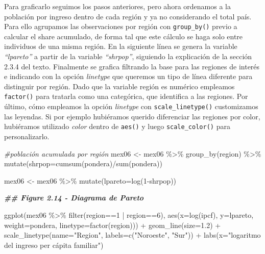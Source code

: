 \documentclass[
]{book}
\newenvironment{Shaded}{\begin{snugshade}}{\end{snugshade}}
\newcommand{\AttributeTok}[1]{\textcolor[rgb]{0.77,0.63,0.00}{#1}}
\newcommand{\CommentTok}[1]{\textcolor[rgb]{0.56,0.35,0.01}{\textit{#1}}}
\newcommand{\DecValTok}[1]{\textcolor[rgb]{0.00,0.00,0.81}{#1}}
\newcommand{\DocumentationTok}[1]{\textcolor[rgb]{0.56,0.35,0.01}{\textbf{\textit{#1}}}}
\newcommand{\FloatTok}[1]{\textcolor[rgb]{0.00,0.00,0.81}{#1}}
\newcommand{\FunctionTok}[1]{\textcolor[rgb]{0.00,0.00,0.00}{#1}}
\newcommand{\NormalTok}[1]{#1}
\newcommand{\OtherTok}[1]{\textcolor[rgb]{0.56,0.35,0.01}{#1}}
\newcommand{\SpecialCharTok}[1]{\textcolor[rgb]{0.00,0.00,0.00}{#1}}
\newcommand{\StringTok}[1]{\textcolor[rgb]{0.31,0.60,0.02}{#1}}
\begin{document}
Para graficarlo seguimos los pasos anteriores, pero ahora ordenamos a la población por ingreso dentro de cada región y ya no considerando el total país. Para ello agrupamos las observaciones por región con \texttt{group\_by()} previo a calcular el share acumulado, de forma tal que este cálculo se haga solo entre individuos de una misma región. En la siguiente línea se genera la variable \emph{``lpareto''} a partir de la variable \emph{``shrpop''}, siguiendo la explicación de la sección 2.3.4 del texto. Finalmente se grafica filtrando la base para las regiones de interés e indicando con la opción \emph{linetype} que queremos un tipo de línea diferente para distinguir por región. Dado que la variable región es numérico empleamos \texttt{factor()} para tratarla como una categórica, que identifica a las regiones. Por último, cómo empleamos la opción \emph{linetype} con \texttt{scale\_linetype()} customizamos las leyendas. Si por ejemplo hubiéramos querido diferenciar las regiones por color, hubiéramos utilizado \emph{color} dentro de \texttt{aes()} y luego \texttt{scale\_color()} para personalizarlo.

\begin{Shaded}
\begin{Highlighting}[]
\CommentTok{\#población acumulada por región}
\NormalTok{mex06 }\OtherTok{\textless{}{-}}\NormalTok{ mex06 }\SpecialCharTok{\%\textgreater{}\%} \FunctionTok{group\_by}\NormalTok{(region) }\SpecialCharTok{\%\textgreater{}\%} \FunctionTok{mutate}\NormalTok{(}\AttributeTok{shrpop=}\FunctionTok{cumsum}\NormalTok{(pondera)}\SpecialCharTok{/}\FunctionTok{sum}\NormalTok{(pondera)) }

\NormalTok{mex06 }\OtherTok{\textless{}{-}}\NormalTok{ mex06 }\SpecialCharTok{\%\textgreater{}\%} \FunctionTok{mutate}\NormalTok{(}\AttributeTok{lpareto=}\FunctionTok{log}\NormalTok{(}\DecValTok{1}\SpecialCharTok{{-}}\NormalTok{shrpop)) }

\DocumentationTok{\#\# Figure 2.14 {-} Diagrama de Pareto}

\FunctionTok{ggplot}\NormalTok{(mex06 }\SpecialCharTok{\%\textgreater{}\%} \FunctionTok{filter}\NormalTok{(region}\SpecialCharTok{==}\DecValTok{1} \SpecialCharTok{|}\NormalTok{ region}\SpecialCharTok{==}\DecValTok{6}\NormalTok{), }
       \FunctionTok{aes}\NormalTok{(}\AttributeTok{x=}\FunctionTok{log}\NormalTok{(ipcf), }\AttributeTok{y=}\NormalTok{lpareto, }\AttributeTok{weight=}\NormalTok{pondera, }\AttributeTok{linetype=}\FunctionTok{factor}\NormalTok{(region))) }\SpecialCharTok{+} 
  \FunctionTok{geom\_line}\NormalTok{(}\AttributeTok{size=}\FloatTok{1.2}\NormalTok{) }\SpecialCharTok{+}
  \FunctionTok{scale\_linetype}\NormalTok{(}\AttributeTok{name=}\StringTok{"Region"}\NormalTok{, }\AttributeTok{labels=}\FunctionTok{c}\NormalTok{(}\StringTok{"Noroeste"}\NormalTok{, }\StringTok{"Sur"}\NormalTok{)) }\SpecialCharTok{+} 
  \FunctionTok{labs}\NormalTok{(}\AttributeTok{x=}\StringTok{"logaritmo del ingreso per cápita familiar"}\NormalTok{)}
\end{Highlighting}
\end{Shaded}
\end{document}
